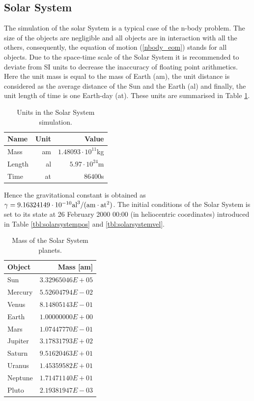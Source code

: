\documentclass[a4paper,12pt,openany]{book}
\newcommand{\equref}[1]{(\ref{#1})}
\theoremstyle{break}
\begin{document}
\subsection{Solar System}
The simulation of the solar System is a typical case of the n-body problem. The size of the objects are negligible and all objects are in interaction with all the others, consequently, the equation of motion \equref{nbody_eom} stands for all objects.
Due to the space-time scale of the Solar System it is recommended to deviate from SI units to decrease the inaccuracy of floating point arithmetics. Here the unit mass is equal to the mass of Earth (am), the unit distance is considered as the average distance of the Sun and the Earth (al) and finally, the unit length of time is one Earth-day (at). These units are summarised in Table \ref{tbl:astronomical_units}.
\begin{table} [h!]
\begin{center}
\caption{Units in the Solar System simulation.}\label{tbl:astronomical_units}
\begin{tabular}{ l r r }
\toprule[1.5pt]
\bf Name & \bf Unit & \bf Value \\
\midrule
Mass & am & $1.48093\cdot 10^{11}$kg \\
Length & al & $5.97\cdot 10^{24}$m \\
Time & at & $86400$s \\
\bottomrule[1.25pt]
\end{tabular}
\end{center}
\end{table}
Hence the gravitational constant is obtained as $\gamma=9.16324149\cdot 10^{-10}\rm{al}^3/(\rm{am}\cdot \rm{at}^2)$. The initial conditions of the Solar System is set to its state at 26 February 2000 00:00 (in heliocentric coordinates) introduced in Table \ref{tbl:solarsystempos} and \ref{tbl:solarsystemvel}. 
\begin{table}
\begin{center}
\caption{Mass of the Solar System planets.}\label{tbl:solarsystemmass}
\begin{tabular}{ l r }
\toprule[1.5pt]
\bf Object & \bf Mass [am] \\
\midrule
Sun & $3.32965046E+05$ \\
Mercury & $5.52604794E-02$ \\
Venus & $8.14805143E-01$ \\
Earth & $1.00000000E+00$ \\
Mars & $1.07447770E-01$ \\
Jupiter & $3.17831793E+02$ \\
Saturn & $9.51620463E+01$ \\
Uranus & $1.45359582E+01$ \\
Neptune & $1.71471140E+01$ \\
Pluto & $2.19381947E-03$ \\
\bottomrule[1.25pt]
\end{tabular}
\end{center}
\end{table}
\end{document}
